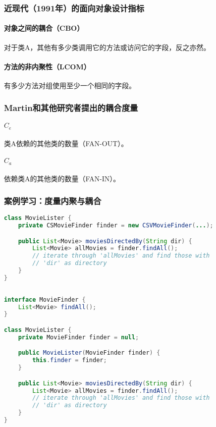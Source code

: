 \subsubsection{近现代（1991年）的面向对象设计指标}

\paragraph{对象之间的耦合（CBO）}对于类A，其他有多少类调用它的方法或访问它的字段，反之亦然。

\paragraph{方法的非内聚性（LCOM）}有多少方法对组使用至少一个相同的字段。

\subsubsection{Martin和其他研究者提出的耦合度量}

\paragraph{$C_e$}类A依赖的其他类的数量（FAN-OUT）。
\paragraph{$C_a$}依赖类A的其他类的数量（FAN-IN）。

\subsubsection{案例学习：度量内聚与耦合}

\begin{lstlisting}[language=Java, caption=Measuring Example A, label=lst:measuring_exa]
class MovieLister {
    private CSMovieFinder finder = new CSVMovieFinder(...);

    public List<Movie> moviesDirectedBy(String dir) {
        List<Movie> allMovies = finder.findAll();
        // iterate through 'allMovies' and find those with
        // 'dir' as directory
    }
}
	
\end{lstlisting}

\begin{lstlisting}[language=Java, caption=Measuring Example B, label=lst:measuring_exb]
interface MovieFinder {
    List<Movie> findAll();
}

class MovieLister {
    private MovieFinder finder = null;

    public MovieLister(MovieFinder finder) {
        this.finder = finder;
    }

    public List<Movie> moviesDirectedBy(String dir) {
        List<Movie> allMovies = finder.findAll();
        // iterate through 'allMovies' and find those with
        // 'dir' as directory
    }
}
	
\end{lstlisting}

